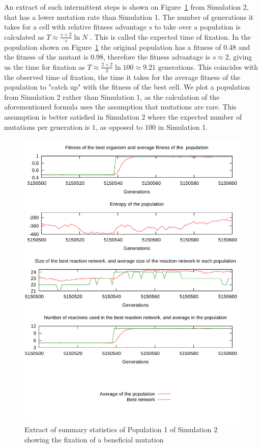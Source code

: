 \documentclass[a4paper,12pt]{article}
\begin{document}
An extract of such intermittent steps is shown on Figure~\ref{fig:fixation} from Simulation 2, that has a lower mutation rate than Simulation 1. The number of generations it takes for a cell with relative fitness advantage $s$ to take over a population is calculated as $T \approx \frac{s+2}{s}\ln N$  \cite{barteklecture}. This is called the expected time of fixation. In the population shown on Figure~\ref{fig:fixation} the original population has a fitness of $0.48$ and the fitness of the mutant is $0.98$, therefore the fitness advantage is $s\approx2$, giving us the time for fixation as $T\approx \frac{2+2}{2}\ln 100 \approx 9.21$ generations. This coincides with the observed time of fixation, the time it takes for the average fitness of the population to "catch up" with the fitness of the best cell. We plot a population from Simulation 2 rather than Simulation 1, as the calculation of the aforementioned formula uses the assumption that mutations are rare. This assumption is better satisfied in Simulation 2 where the expected number of mutations per generation is $1$, as opposed to $100$ in Simulation 1.

\begin{figure}[htpb]
	\centering
	\includegraphics[width=0.8\linewidth]{fixation.pdf}
	\caption{Extract of summary statistics of Population 1 of Simulation 2 showing the fixation of a beneficial mutation}
	\label{fig:fixation}
\end{figure}
\end{document}
